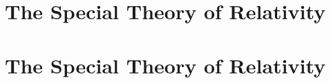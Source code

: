 \def\chapterbody{
  \section{The Special Theory of Relativity}
  
  
  
  
  
  
  
  
  
}

\ifx\bookmode\undefined
  

  \setcounter{section}{14}

  
    \chapterbody
  
\else
  \chapterbody
\fi
